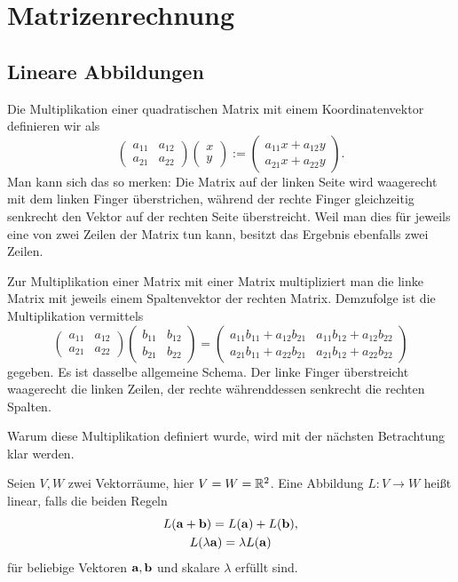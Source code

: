 \section{Matrizenrechnung}
\subsection{Lineare Abbildungen}

Die Multiplikation einer quadratischen Matrix mit einem
Koordinatenvektor definieren wir als%
\[\begin{pmatrix}
a_{11} & a_{12}\\
a_{21} & a_{22}
\end{pmatrix}\begin{pmatrix}x \\ y\end{pmatrix}
:= \begin{pmatrix}a_{11}x+a_{12}y \\ a_{21}x+a_{22}y\end{pmatrix}.\]
Man kann sich das so merken: Die Matrix auf der linken Seite wird
waagerecht mit dem linken Finger überstrichen, während der rechte
Finger gleichzeitig senkrecht den Vektor auf der rechten Seite
überstreicht. Weil man dies für jeweils eine von zwei Zeilen der Matrix
tun kann, besitzt das Ergebnis ebenfalls zwei Zeilen.

Zur Multiplikation einer Matrix mit einer Matrix multipliziert man
die linke Matrix mit jeweils einem Spaltenvektor der rechten
Matrix. Demzufolge ist die Multiplikation vermittels%
\[\begin{pmatrix}
a_{11} &\!\! a_{12}\\
a_{21} &\!\! a_{22}
\end{pmatrix}\begin{pmatrix}
b_{11} &\!\! b_{12}\\
b_{21} &\!\! b_{22}
\end{pmatrix} = \begin{pmatrix}
a_{11}b_{11}+a_{12}b_{21} &\! a_{11}b_{12}+a_{12}b_{22}\\
a_{21}b_{11}+a_{22}b_{21} &\! a_{21}b_{12}+a_{22}b_{22}
\end{pmatrix}\]
gegeben. Es ist dasselbe allgemeine Schema. Der linke Finger
überstreicht waagerecht die linken Zeilen, der rechte währenddessen
senkrecht die rechten Spalten.

Warum diese Multiplikation definiert wurde, wird mit der nächsten
Betrachtung klar werden.

Seien $V,W$ zwei Vektorräume, hier $V=W=\mathbb R^2$. Eine Abbildung
$L\colon V\to W$ heißt linear, falls die beiden Regeln%
\begin{gather}\label{eq:homogen}
L(\mathbf{a} + \mathbf{b}) = L(\mathbf{a}) + L(\mathbf{b}),\\
\label{eq:additiv}
L(\lambda\mathbf{a}) = \lambda L(\mathbf{a})
\end{gather}
für beliebige Vektoren $\mathbf{a},\mathbf{b}$ und skalare $\lambda$ erfüllt
sind.

